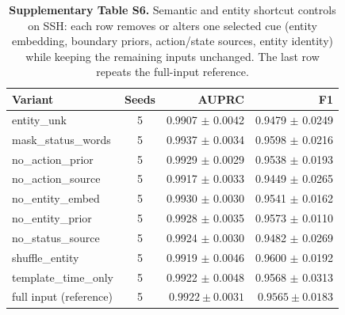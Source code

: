 \documentclass[11pt,a4paper]{article}
\begin{document}
\begin{table}[H]
\centering
\caption*{\textbf{Supplementary Table S6.} Semantic and entity shortcut controls on SSH: each row removes or alters one selected cue (entity embedding, boundary priors, action/state sources, entity identity) while keeping the remaining inputs unchanged. The last row repeats the full-input reference.}
{\small
\begin{tabular}{lcrr}
\toprule
Variant & Seeds & AUPRC & F1 \\
\midrule
entity\_unk & 5 & 0.9907 $\pm$ 0.0042 & 0.9479 $\pm$ 0.0249 \\
mask\_status\_words & 5 & 0.9937 $\pm$ 0.0034 & 0.9598 $\pm$ 0.0216 \\
no\_action\_prior & 5 & 0.9929 $\pm$ 0.0029 & 0.9538 $\pm$ 0.0193 \\
no\_action\_source & 5 & 0.9917 $\pm$ 0.0033 & 0.9449 $\pm$ 0.0265 \\
no\_entity\_embed & 5 & 0.9930 $\pm$ 0.0030 & 0.9541 $\pm$ 0.0162 \\
no\_entity\_prior & 5 & 0.9928 $\pm$ 0.0035 & 0.9573 $\pm$ 0.0110 \\
no\_status\_source & 5 & 0.9924 $\pm$ 0.0030 & 0.9482 $\pm$ 0.0269 \\
shuffle\_entity & 5 & 0.9919 $\pm$ 0.0046 & 0.9600 $\pm$ 0.0192 \\
template\_time\_only & 5 & 0.9922 $\pm$ 0.0048 & 0.9568 $\pm$ 0.0313 \\
full input (reference) & 5 & $0.9922 \pm 0.0031$ & $0.9565 \pm 0.0183$ \\
\bottomrule
\end{tabular}
}
\end{table}
\end{document}
